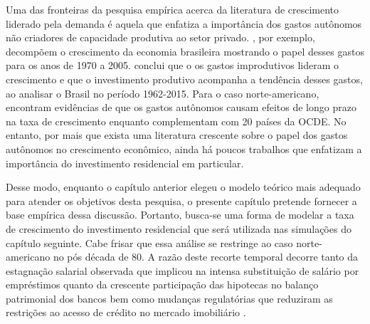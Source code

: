 Uma das fronteiras da pesquisa empírica acerca da literatura de crescimento liderado pela demanda é aquela que enfatiza a importância dos gastos autônomos não criadores de capacidade produtiva ao setor privado. \textcite{freitas_pattern_2013}, por exemplo, decompõem o crescimento da economia brasileira mostrando o papel desses gastos para os anos de  1970 a 2005. \textcite{braga_investment_2018} conclui que o os gastos improdutivos lideram o crescimento e que o investimento produtivo acompanha a tendência desses gastos, ao analisar o Brasil no período 1962-2015. Para o caso norte-americano, \textcite{girardi_long-run_2016} encontram evidências de que os gastos autônomos causam efeitos de longo prazo na taxa de crescimento enquanto \textcite{girardi_autonomous_2018} complementam com 20 países da OCDE. No entanto, por mais que exista uma literatura crescente sobre o papel dos gastos autônomos no crescimento econômico, ainda há poucos trabalhos que enfatizam a importância do investimento residencial em particular. 

Desse modo, enquanto o capítulo anterior elegeu o modelo teórico mais adequado para atender os objetivos desta pesquisa, o presente capítulo pretende fornecer a base empírica dessa discussão. Portanto, busca-se uma forma de modelar a taxa de crescimento do investimento residencial que será utilizada nas simulações do capítulo seguinte. 
Cabe frisar que essa análise se restringe ao caso norte-americano no pós década de 80. A razão deste recorte temporal decorre tanto da estagnação salarial observada \cite{teixeira_uma_2011} que implicou na intensa substituição de salário por empréstimos \cite{barba_rising_2009} quanto da crescente participação das hipotecas no balanço patrimonial dos bancos \cite{jorda_great_2014} bem como mudanças regulatórias que reduziram as restrições ao acesso de crédito no mercado imobiliário \cites{linneman_impacts_1989}{duca_empirical_1991}. 


